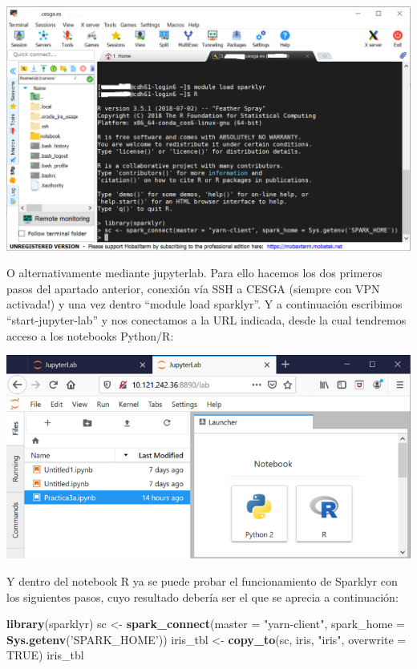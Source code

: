 \documentclass[]{book}
\newenvironment{Shaded}{\begin{snugshade}}{\end{snugshade}}
\newcommand{\DataTypeTok}[1]{\textcolor[rgb]{0.13,0.29,0.53}{#1}}
\newcommand{\KeywordTok}[1]{\textcolor[rgb]{0.13,0.29,0.53}{\textbf{#1}}}
\newcommand{\NormalTok}[1]{#1}
\newcommand{\OtherTok}[1]{\textcolor[rgb]{0.56,0.35,0.01}{#1}}
\newcommand{\StringTok}[1]{\textcolor[rgb]{0.31,0.60,0.02}{#1}}
\begin{document}
\includegraphics{images/T3-sparklyr1.png}

O alternativamente mediante jupyterlab. Para ello hacemos los dos primeros pasos del apartado anterior, conexión vía SSH a CESGA (siempre con VPN activada!) y una vez dentro ``module load sparklyr''. Y a continuación escribimos ``start-jupyter-lab'' y nos conectamos a la URL indicada, desde la cual tendremos acceso a los notebooks Python/R:

\includegraphics{images/T3-sparklyr2.png}

Y dentro del notebook R ya se puede probar el funcionamiento de Sparklyr con los siguientes pasos, cuyo resultado debería ser el que se aprecia a continuación:

\begin{Shaded}
\begin{Highlighting}[]
\KeywordTok{library}\NormalTok{(sparklyr)}
\NormalTok{sc <-}\StringTok{ }\KeywordTok{spark_connect}\NormalTok{(}\DataTypeTok{master =} \StringTok{"yarn-client"}\NormalTok{, }\DataTypeTok{spark_home =} \KeywordTok{Sys.getenv}\NormalTok{(}\StringTok{'SPARK_HOME'}\NormalTok{)) }
\NormalTok{iris_tbl <-}\StringTok{ }\KeywordTok{copy_to}\NormalTok{(sc, iris, }\StringTok{"iris"}\NormalTok{, }\DataTypeTok{overwrite =} \OtherTok{TRUE}\NormalTok{)}
\NormalTok{iris_tbl}
\end{Highlighting}
\end{Shaded}
\end{document}

